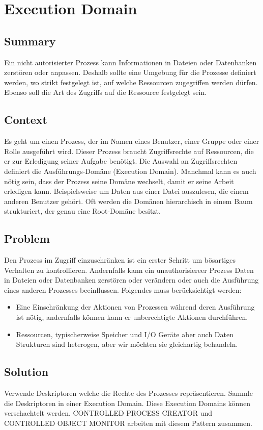 \chapter{Execution Domain}

\section{Summary}
Ein nicht autorisierter Prozess kann Informationen in Dateien oder Datenbanken zerstören oder anpassen. Deshalb sollte eine Umgebung für die Prozesse definiert werden, wo strikt festgelegt ist, auf welche Ressourcen zugegriffen werden dürfen. Ebenso soll die Art des Zugriffs auf die Ressource festgelegt sein.

\section{Context}
Es geht um einen Prozess, der im Namen eines Benutzer, einer Gruppe oder einer Rolle ausgeführt wird. Dieser Prozess braucht Zugriffsrechte auf Ressourcen, die er zur Erledigung seiner Aufgabe benötigt. Die Auswahl an Zugriffsrechten definiert die Ausführungs-Domäne (Execution Domain). Manchmal kann es auch nötig sein, dass der Prozess seine Domäne wechselt, damit er seine Arbeit erledigen kann. Beispielsweise um Daten aus einer Datei auszulesen, die einem anderen Benutzer gehört. Oft werden die Domänen hierarchisch in einem Baum strukturiert, der genau eine Root-Domäne besitzt.

\section{Problem}
Den Prozess im Zugriff einzuschränken ist ein erster Schritt um bösartiges Verhalten zu kontrollieren. Andernfalls kann ein unauthorisiereer Prozess Daten in Dateien oder Datenbanken zerstören oder verändern oder auch die Ausführung eines anderen Prozesses beeinflussen. Folgendes muss berücksichtigt werden:
\begin{itemize}
  \item Eine Einschränkung der Aktionen von Prozessen während deren Ausführung ist nötig, andernfalls können kann er unberechtigte Aktionen durchführen.
  \item Ressourcen, typischerweise Speicher und I/O Geräte aber auch Daten Strukturen sind heterogen, aber wir möchten sie gleichartig behandeln.
\end{itemize}

\section{Solution}
Verwende Deskriptoren welche die Rechte des Prozesses repräsentieren. Sammle die Deskriptoren in einer Execution Domain. Diese Execution Domains können verschachtelt werden.
CONTROLLED PROCESS CREATOR und CONTROLLED OBJECT MONITOR arbeiten mit diesem Pattern zusammen.

